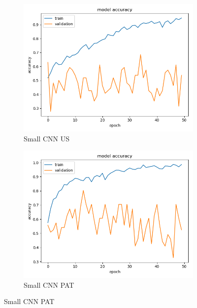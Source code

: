 \begin{figure}
\centering
\begin{subfigure}[b]{.45\linewidth}
\includegraphics[width=\linewidth]{Figs/small_us_acc.jpg}
\caption{Small CNN US}
\end{subfigure}
\begin{subfigure}[b]{.45\linewidth}
\includegraphics[width=\linewidth]{Figs/small_pat_acc.jpg}
\caption{Small CNN PAT}
\end{subfigure}


\end{figure}
